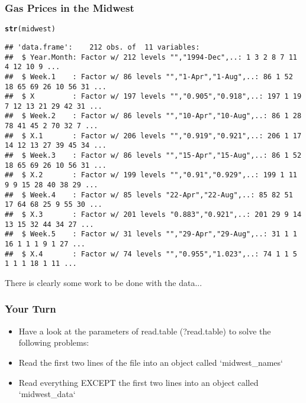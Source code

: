 \documentclass{beamer}\usepackage[]{graphicx}\usepackage[]{color}
\makeatletter
\newcommand{\hlstd}[1]{\textcolor[rgb]{0.345,0.345,0.345}{#1}}%
\newcommand{\hlkwd}[1]{\textcolor[rgb]{0.737,0.353,0.396}{\textbf{#1}}}%
\newenvironment{kframe}{%
 \def\at@end@of@kframe{}%
 \ifinner\ifhmode%
  \def\at@end@of@kframe{\end{minipage}}%
  \begin{minipage}{\columnwidth}%
 \fi\fi%
 \def\FrameCommand##1{\hskip\@totalleftmargin \hskip-\fboxsep
 \colorbox{shadecolor}{##1}\hskip-\fboxsep
     \hskip-\linewidth \hskip-\@totalleftmargin \hskip\columnwidth}%
 \MakeFramed {\advance\hsize-\width
   \@totalleftmargin\z@ \linewidth\hsize
   \@setminipage}}%
 {\par\unskip\endMakeFramed%
 \at@end@of@kframe}
\newenvironment{knitrout}{}{} %
\makeatother
\begin{document}
\begin{frame}[fragile]
\frametitle{Gas Prices in the Midwest}
\begin{knitrout}\scriptsize
{}\color{fgcolor}\begin{kframe}
\begin{alltt}
\hlkwd{str}\hlstd{(midwest)}
\end{alltt}
\begin{verbatim}
## 'data.frame':	212 obs. of  11 variables:
##  $ Year.Month: Factor w/ 212 levels "","1994-Dec",..: 1 3 2 8 7 11 4 12 10 9 ...
##  $ Week.1    : Factor w/ 86 levels "","1-Apr","1-Aug",..: 86 1 52 18 65 69 26 10 56 31 ...
##  $ X         : Factor w/ 197 levels "","0.905","0.918",..: 197 1 19 7 12 13 21 29 42 31 ...
##  $ Week.2    : Factor w/ 86 levels "","10-Apr","10-Aug",..: 86 1 28 78 41 45 2 70 32 7 ...
##  $ X.1       : Factor w/ 206 levels "","0.919","0.921",..: 206 1 17 14 12 13 27 39 45 34 ...
##  $ Week.3    : Factor w/ 86 levels "","15-Apr","15-Aug",..: 86 1 52 18 65 69 26 10 56 31 ...
##  $ X.2       : Factor w/ 199 levels "","0.91","0.929",..: 199 1 11 9 9 15 28 40 38 29 ...
##  $ Week.4    : Factor w/ 85 levels "22-Apr","22-Aug",..: 85 82 51 17 64 68 25 9 55 30 ...
##  $ X.3       : Factor w/ 201 levels "0.883","0.921",..: 201 29 9 14 13 15 32 44 34 27 ...
##  $ Week.5    : Factor w/ 31 levels "","29-Apr","29-Aug",..: 31 1 1 16 1 1 1 9 1 27 ...
##  $ X.4       : Factor w/ 74 levels "","0.955","1.023",..: 74 1 1 5 1 1 1 18 1 11 ...
\end{verbatim}
\end{kframe}
\end{knitrout}

There is clearly some work to be done with the data...
\end{frame}

\begin{frame}
\frametitle{Your Turn}
\begin{itemize}
\item Have a look at the parameters of read.table (?read.table) to solve the following problems:
\item Read the first two lines of the file into an object called `midwest\_names`
\item Read everything EXCEPT the first two lines into an object called `midwest\_data`
\end{itemize}
\end{frame}
\end{document}
